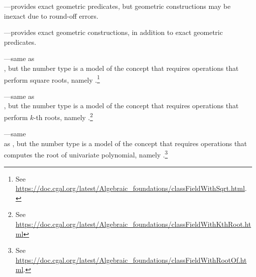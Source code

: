 \begin{compactenum}
\item {}---provides
  exact geometric predicates, but geometric constructions may be inexact
  due to round-off errors.
\item {}---provides
  exact geometric constructions, in addition to exact geometric predicates.
\item {}---same
  as\\
  , but the
  number type is a model of the concept that requires operations that perform
  square roots, namely .\footnote{See \url{https://doc.cgal.org/latest/Algebraic_foundations/classFieldWithSqrt.html}.}
\item {}---same
  as \\
  , but the number
  type is a model of the concept that requires operations that perform $k$-th
  roots, namely
  .\footnote{See \url{https://doc.cgal.org/latest/Algebraic_foundations/classFieldWithKthRoot.html}}
\item {}---same\\
  as , but the number
  type is a model of the concept that requires operations that computes the root of univariate polynomial, namely .\footnote{See \url{https://doc.cgal.org/latest/Algebraic_foundations/classFieldWithRootOf.html}.}
\end{compactenum}

\begin{table}[!htp]
  \caption{\iiDandiiiDGeometryKernelPackage{} module flags}
  \centering{}
 \label{tab:ker}
\end{table}

